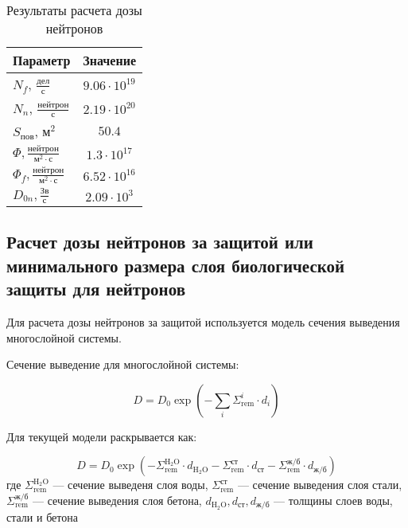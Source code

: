 \begin{table}[H]
	\caption{Результаты расчета дозы нейтронов}
	\begin{center}
        \begin{tabular}{|l|c|}
        \toprule
         Параметр & Значение \\
         \midrule
         \hline
         $N_f$, $\frac{\text{дел}}{\text{с}}$ & $9.06 \cdot 10^{19}$ \\ 
         \hline
         $N_n$, $\frac{\text{нейтрон}}{\text{с}}$ & $2.19 \cdot 10^{20}$ \\
         \hline
         $S_{\text{пов}}$, $\text{м}^2$ & $50.4$ \\
         \hline
         $\Phi, \frac{\text{нейтрон}}{\text{м}^2 \cdot \text{с}}$ & $1.3 \cdot 10^{17}$\\
         \hline
         $\Phi_f, \frac{\text{нейтрон}}{\text{м}^2 \cdot \text{с}}$ & $6.52 \cdot 10^{16}$ \\
         \hline
         $D_{0n}, \frac{\text{Зв}}{\text{с}}$ & $2.09 \cdot 10^3$ \\
         \bottomrule
		\end{tabular}
		\label{tabular:bio_sec_1_out}
	\end{center}
\end{table}


\subsection{Расчет дозы нейтронов за защитой или минимального размера слоя биологической защиты для нейтронов}
Для расчета дозы нейтронов за защитой используется модель сечения выведения многослойной системы.

\noindent Сечение выведение для многослойной системы:

\begin{equation}
        D = D_0 \exp\left(
                - \sum_i \Sigma_{\text{rem}}^i \cdot d_i
        \right)
\end{equation}

\noindent Для текущей модели раскрывается как:

\begin{equation}
        D = D_0 \exp\left(
                - \Sigma_{\text{rem}}^{\text{H}_2\text{O}} \cdot d_{\text{H}_2\text{O}}
                - \Sigma_{\text{rem}}^{\text{ст}} \cdot d_{\text{ст}}
                - \Sigma_{\text{rem}}^{\text{ж/б}} \cdot d_{\text{ж/б}}
        \right)
\end{equation}
\noindent где $\Sigma_{\text{rem}}^{\text{H}_2\text{O}}$ — сечение выведеня слоя воды,
              $\Sigma_{\text{rem}}^{\text{ст}}$ — сечение выведения слоя стали,
              $\Sigma_{\text{rem}}^{\text{ж/б}}$ — сечение выведения слоя бетона,
              $d_{\text{H}_2\text{O}}, d_{\text{ст}}, d_{\text{ж/б}}$ — толщины слоев воды, стали и бетона


